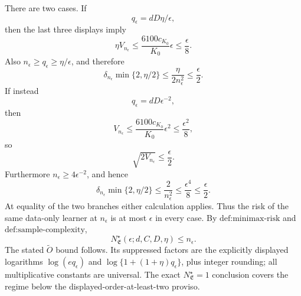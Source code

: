 There are two cases. If
\[
q_\epsilon=dD\eta/\epsilon,
\]
then the last three displays imply
\[
\eta V_{n_\epsilon}
\le
\frac{6100c_{K_0}}{K_0}\epsilon
\le\frac\epsilon8.
\]
Also \(n_\epsilon\ge q_\epsilon\ge\eta/\epsilon\), and therefore
\[
\delta_{n_\epsilon}\min\{2,\eta/2\}
\le\frac{\eta}{2n_\epsilon^2}
\le\frac\epsilon2.
\]
If instead
\[
q_\epsilon=dD\epsilon^{-2},
\]
then
\[
V_{n_\epsilon}
\le
\frac{6100c_{K_0}}{K_0}\epsilon^2
\le\frac{\epsilon^2}{8},
\]
so
\[
\sqrt{2V_{n_\epsilon}}\le\frac\epsilon2.
\]
Furthermore \(n_\epsilon\ge4\epsilon^{-2}\), and hence
\[
\delta_{n_\epsilon}\min\{2,\eta/2\}
\le\frac2{n_\epsilon^2}
\le\frac{\epsilon^4}{8}
\le\frac\epsilon2.
\]
At equality of the two branches either calculation applies. Thus the risk of the same data-only learner at \(n_\epsilon\) is at most \(\epsilon\) in every case. By \(\text{def:minimax-risk}\) and \(\text{def:sample-complexity}\),
\[
N^\star_{\mathfrak E}(\epsilon;d,C,D,\eta)
\le n_\epsilon.
\]
The stated \(\widetilde O\) bound follows. Its suppressed factors are the explicitly displayed logarithms \(\log(e q_\epsilon)\) and \(\log\{1+(1+\eta)q_\epsilon\}\), plus integer rounding; all multiplicative constants are universal. The exact \(N^\star_{\mathfrak E}=1\) conclusion covers the regime below the displayed-order-at-least-two proviso.